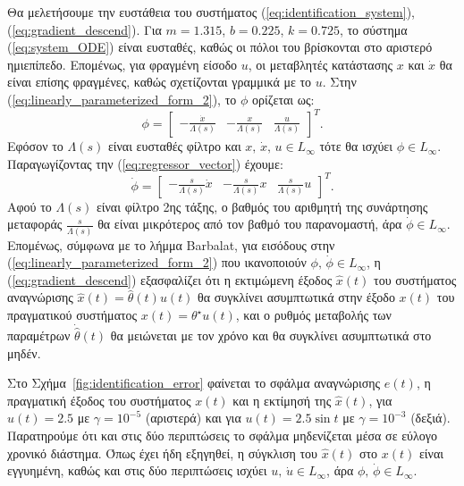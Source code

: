 \documentclass[a4paper,12pt]{article}
\begin{document}
Θα μελετήσουμε την ευστάθεια του συστήματος (\ref{eq:identification_system}), (\ref{eq:gradient_descend}).
Για $m = 1.315$, $b = 0.225$, $k = 0.725$, το σύστημα (\ref{eq:system_ODE}) είναι ευσταθές, καθώς
οι πόλοι του βρίσκονται στο αριστερό ημιεπίπεδο. Επομένως, για φραγμένη είσοδο $u$, οι μεταβλητές κατάστασης
$x$ και $\dot{x}$ θα είναι επίσης φραγμένες, καθώς σχετίζονται γραμμικά με το $u$. Στην
(\ref{eq:linearly_parameterized_form_2}), το $\phi$ ορίζεται ως:
\begin{equation}
\phi = 
    \begin{bmatrix}
        -\frac{\dot{x}}{\Lambda(s)} & -\frac{x}{\Lambda(s)} & \frac{u}{\Lambda(s)}
    \end{bmatrix}^T. 
    \label{eq:regressor_vector}
\end{equation}
Εφόσον το $\Lambda(s)$ είναι ευσταθές φίλτρο και $x, \, \dot{x}, \, u \in L_{\infty}$ τότε θα ισχύει
$\phi \in L_{\infty}$. Παραγωγίζοντας την (\ref{eq:regressor_vector}) έχουμε:
\begin{equation}
\dot{\phi} = 
    \begin{bmatrix}
        -\frac{s}{\Lambda(s)}\dot{x} & -\frac{s}{\Lambda(s)}x & \frac{s}{\Lambda(s)}u
    \end{bmatrix}^T. 
    \label{eq:regressor_vector_derivative}
\end{equation}
Αφού το $\Lambda(s)$ είναι φίλτρο 2ης τάξης, ο βαθμός του αριθμητή της συνάρτησης μεταφοράς 
$\frac{s}{\Lambda(s)}$ θα είναι μικρότερος από τον βαθμό του παρανομαστή, άρα $\dot{\phi} \in L_{\infty}$.
Επομένως, σύμφωνα με το λήμμα Barbalat, για εισόδους στην
(\ref{eq:linearly_parameterized_form_2}) που ικανοποιούν $\phi, \, \dot{\phi} \in L_{\infty}$, η 
(\ref{eq:gradient_descend}) εξασφαλίζει ότι η εκτιμώμενη έξοδος $\hat{x}(t)$ του συστήματος αναγνώρισης
$\hat{x}(t) = \hat{\theta}(t) u(t)$ θα συγκλίνει ασυμπτωτικά στην έξοδο $x(t)$ του πραγματικού συστήματος 
$x(t) = \theta^{\star}u(t)$, και ο ρυθμός μεταβολής των παραμέτρων $\dot{\hat{\theta}}(t)$ θα μειώνεται με τον
χρόνο και θα συγκλίνει ασυμπτωτικά στο μηδέν.

Στο Σχήμα~\ref{fig:identification_error} φαίνεται το σφάλμα αναγνώρισης $e(t)$, η πραγματική έξοδος του 
συστήματος $x(t)$ και η εκτίμησή της $\hat{x}(t)$, για $u(t) = 2.5$ με $\gamma = 10^{-5}$ (αριστερά) και για 
$u(t) = 2.5 \sin t$ με $\gamma = 10^{-3}$ (δεξιά). Παρατηρούμε ότι και στις δύο περιπτώσεις το σφάλμα 
μηδενίζεται μέσα σε εύλογο χρονικό διάστημα. Όπως έχει ήδη εξηγηθεί, η σύγκλιση του $\hat{x}(t)$ στο 
$x(t)$ είναι εγγυημένη, καθώς και στις δύο περιπτώσεις ισχύει $u, \, \dot{u} \in L_{\infty}$, άρα 
$\phi, \, \dot{\phi} \in L_{\infty}$.
\end{document}
